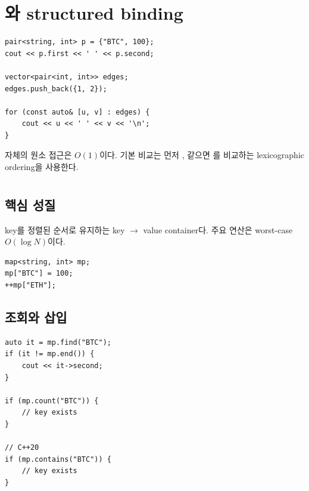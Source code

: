 \section{와 structured binding}
\begin{lstlisting}
pair<string, int> p = {"BTC", 100};
cout << p.first << ' ' << p.second;

vector<pair<int, int>> edges;
edges.push_back({1, 2});

for (const auto& [u, v] : edges) {
    cout << u << ' ' << v << '\n';
}
\end{lstlisting}

 자체의 원소 접근은 $O(1)$이다. 기본 비교는 먼저 , 같으면 를 비교하는 lexicographic ordering을 사용한다.

\section{}
\subsection{핵심 성질}
key를 정렬된 순서로 유지하는 key $\to$ value container다. 주요 연산은 worst-case $O(\log N)$이다.

\begin{lstlisting}
map<string, int> mp;
mp["BTC"] = 100;
++mp["ETH"];
\end{lstlisting}

\subsection{조회와 삽입}
\begin{lstlisting}
auto it = mp.find("BTC");
if (it != mp.end()) {
    cout << it->second;
}

if (mp.count("BTC")) {
    // key exists
}

// C++20
if (mp.contains("BTC")) {
    // key exists
}
\end{lstlisting}

